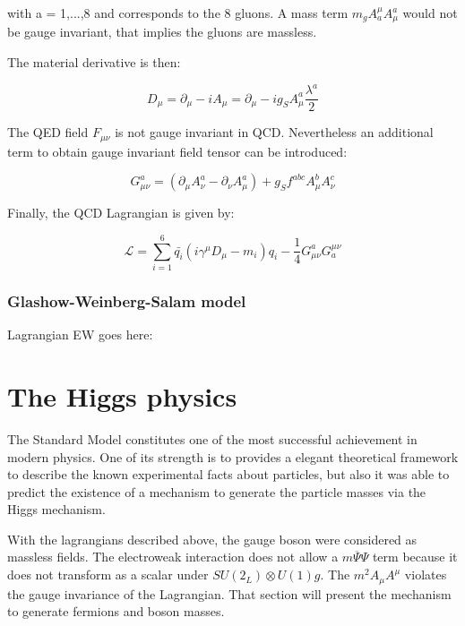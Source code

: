     with a = 1,...,8 and corresponds to the 8 gluons.
    A mass term  $m_g A^{\mu}_a A^a_{\mu}$ would not be gauge invariant, that implies the gluons are massless.

    The material derivative is then:

    \begin{equation}
      D_{\mu} = \partial_{\mu} - i A_{\mu} = \partial_{\mu} - i g_S A^a_{\mu} \frac{\lambda^a}{2}
    \end{equation}

    The QED field $F_{\mu \nu}$ is not gauge invariant in QCD.
    Nevertheless an additional term to obtain gauge invariant field tensor can be introduced:
    
    \begin{equation}
      G^a_{\mu \nu} = \left( \partial_{\mu} A^a_{\nu} - \partial_{\nu} A^a_{\mu} \right) + g_S f^{abc} A^b_{\mu} A^c_{\nu}
    \end{equation} 

    Finally, the QCD Lagrangian is given by:

    \begin{equation}
      \mathcal{L} = \sum_{i=1}^6  \bar{q_i} \left(i \gamma^{\mu}D_{\mu} -m_i \right)q_i - \frac{1}{4} G_{\mu \nu}^{a} G_{a}^{\mu \nu}
    \end{equation}
    
    \subsubsection{Glashow-Weinberg-Salam model}
  
    Lagrangian EW goes here: 

  \section{The Higgs physics}

    The Standard Model constitutes one of the most successful achievement in modern physics.
    One of its strength is to provides a elegant theoretical framework to describe the known experimental facts about particles, but also it was able to predict 
    the existence of a mechanism to generate the particle masses via the Higgs mechanism.

    With the lagrangians described above, the gauge boson were considered as massless fields.
    The electroweak interaction does not allow a $m\overline{\Psi}\Psi$ term because it does not transform as a scalar under $SU(2_L)\otimes U(1)g$.
    The $m^2A_{\mu} A^{\mu}$ violates the gauge invariance of the Lagrangian.
    That section will present the mechanism to generate fermions and boson masses.


